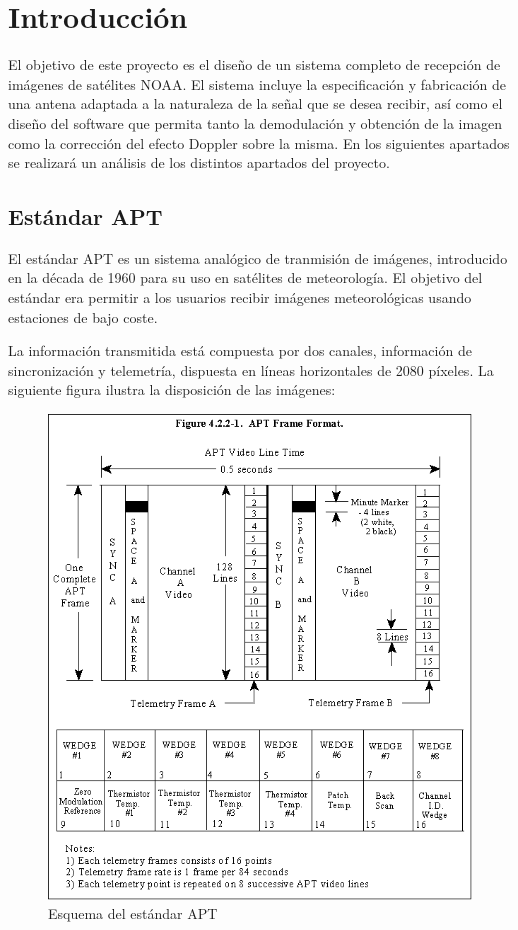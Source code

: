 \documentclass[a4paper,openright,12pt]{article}
\begin{document}


\tableofcontents
\newpage

\section{Introducción}

	El objetivo 	de este proyecto es el diseño de un sistema completo de recepción de imágenes de satélites NOAA. El sistema incluye la especificación y fabricación de una antena adaptada a la naturaleza de la señal que se desea recibir, así como el diseño del software que permita tanto la demodulación y obtención de la imagen como la corrección del efecto Doppler sobre la misma. En los siguientes apartados se realizará un análisis de los distintos apartados del proyecto.
	
	\subsection{Estándar APT}
	
	El estándar APT es un sistema analógico de tranmisión de imágenes, introducido en la década de 1960 para su uso en satélites de meteorología. El objetivo del estándar era permitir a los usuarios recibir imágenes meteorológicas usando estaciones de bajo coste. 
	
	La información transmitida está compuesta por dos canales, información de sincronización y telemetría, dispuesta en líneas horizontales de 2080 píxeles. La siguiente figura ilustra la disposición de las imágenes:
	
	\begin{figure}[hbtp]
 \centering
 \includegraphics[width = 16cm]{imagenes/APT_frame.gif}
 \caption{Esquema del estándar APT}
 \label{APT}
 \end{figure}
\end{document}
